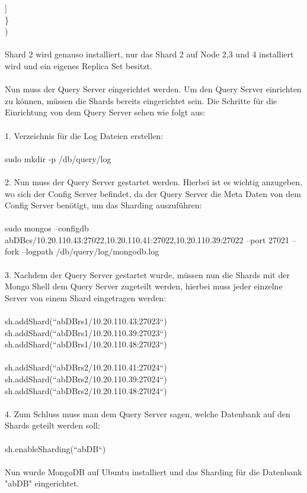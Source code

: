     ] \\
  \} \\
) \\
\\
Shard 2 wird genauso installiert, nur das Shard 2 auf Node 2,3 und 4 installiert wird und ein eigenes Replica Set besitzt.
\\
\\
Nun muss der Query Server eingerichtet werden. Um den Query Server einrichten zu k\"onnen, m\"ussen die Shards bereits eingerichtet sein. Die Schritte f\"ur die Einrichtung von dem Query Server sehen wie folgt aus:
\\
\\
1.	Verzeichnis f\"ur die Log Dateien erstellen:
\\
\\
sudo mkdir -p /db/query/log
\\
\\
2.	Nun muss der Query Server gestartet werden. Hierbei ist es wichtig anzugeben, wo sich der Config Server befindet, da der Query Server die Meta Daten von dem Config Server ben\"otigt, um das Sharding auszuf\"uhren:
\\
\\
sudo mongos --configdb abDBcs/10.20.110.43:27022,10.20.110.41:27022,10.20.110.39:27022 --port 27021 --fork --logpath /db/query/log/mongodb.log
\\
\\
3.	Nachdem der Query Server gestartet wurde, m\"ussen nun die Shards mit der Mongo Shell dem Query Server zugeteilt werden, hierbei muss jeder einzelne Server von einem Shard eingetragen werden:
\\
\\
sh.addShard(“abDBrs1/10.20.110.43:27023“) \\
sh.addShard(“abDBrs1/10.20.110.39:27023“) \\
sh.addShard(“abDBrs1/10.20.110.48:27023“) \\
\\
sh.addShard(“abDBrs2/10.20.110.41:27024“) \\
sh.addShard(“abDBrs2/10.20.110.39:27024“) \\
sh.addShard(“abDBrs2/10.20.110.48:27024“) \\
\\
4.	Zum Schluss muss man dem Query Server sagen, welche Datenbank auf den Shards geteilt werden soll:
\\
\\
sh.enableSharding(“abDB“)
\\
\\
Nun wurde MongoDB auf Ubuntu installiert und das Sharding f\"ur die Datenbank "abDB" eingerichtet.\cite{mongo01}
